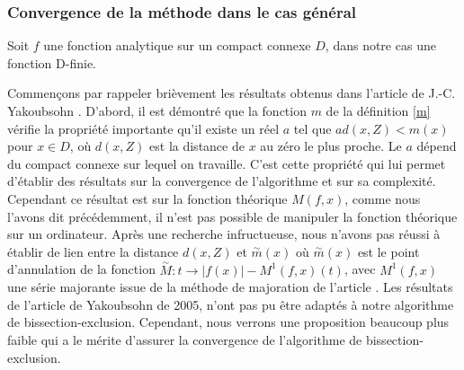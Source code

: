 \documentclass[a4paper,10pt]{article}
\begin{document}
	\subsubsection{Convergence de la méthode dans le cas général}
	Soit $f$ une fonction analytique sur un compact connexe $D$, dans notre cas une fonction D-finie.
	
	Commençons par rappeler brièvement les résultats obtenus dans l'article de J.-C. Yakoubsohn \cite{DBLP:journals/jc/Yakoubsohn05}. 
	D'abord, il est démontré que la fonction $m$ de la définition \eqref{m} vérifie la propriété importante qu'il existe un réel $a$ tel que 
	$a d(x,Z)<m(x)$ pour $x \in D$, où $d(x,Z)$ est la distance de $x$ au zéro le plus proche. Le $a$ dépend du compact connexe sur lequel on travaille. 
	C'est cette propriété qui lui permet d'établir des résultats sur la convergence de l'algorithme et sur sa complexité.\\
	Cependant ce résultat est sur la fonction théorique $M(f,x)$, comme nous l'avons dit précédemment, il n'est pas possible de manipuler la fonction théorique 
	sur un ordinateur. Après une recherche infructueuse, nous n'avons pas réussi à établir de lien entre la distance $d(x,Z)$ et $\overset{\sim}{m}(x)$ où $\overset{\sim}{m}(x)$ est le point d'annulation de la fonction $\overset{\sim}{M}: t \rightarrow |f(x)|-M^1(f,x)(t)$, avec $M^{1}(f,x)$ une série majorante issue de la méthode de majoration de l'article \cite{Mezzarobba2019}.  
	Les résultats de l'article de Yakoubsohn de 2005, n'ont pas pu être adaptés à notre algorithme de bissection-exclusion. Cependant, nous verrons une proposition beaucoup plus faible qui a le mérite d'assurer la convergence de l'algorithme de bissection-exclusion.
	
\end{document}
